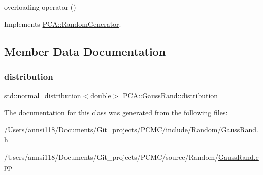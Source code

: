 overloading operator () 



Implements \hyperlink{class_p_c_a_1_1_random_generator_a4361e39397900ae1e7b2cfa91a592509}{P\+C\+A\+::\+Random\+Generator}.



\subsection{Member Data Documentation}
\hypertarget{class_p_c_a_1_1_gauss_rand_a2a3c5494238db1cc94c2408227d9dbed}{}\label{class_p_c_a_1_1_gauss_rand_a2a3c5494238db1cc94c2408227d9dbed} 
\subsubsection{\texorpdfstring{distribution}{distribution}}
{\footnotesize\ttfamily std\+::normal\+\_\+distribution$<$double$>$ P\+C\+A\+::\+Gauss\+Rand\+::distribution\hspace{0.3cm}{\ttfamily [private]}}



The documentation for this class was generated from the following files\+:\begin{DoxyCompactItemize}
\item 
/\+Users/annsi118/\+Documents/\+Git\+\_\+projects/\+P\+C\+M\+C/include/\+Random/\hyperlink{_gauss_rand_8h}{Gauss\+Rand.\+h}\item 
/\+Users/annsi118/\+Documents/\+Git\+\_\+projects/\+P\+C\+M\+C/source/\+Random/\hyperlink{_gauss_rand_8cpp}{Gauss\+Rand.\+cpp}\end{DoxyCompactItemize}
